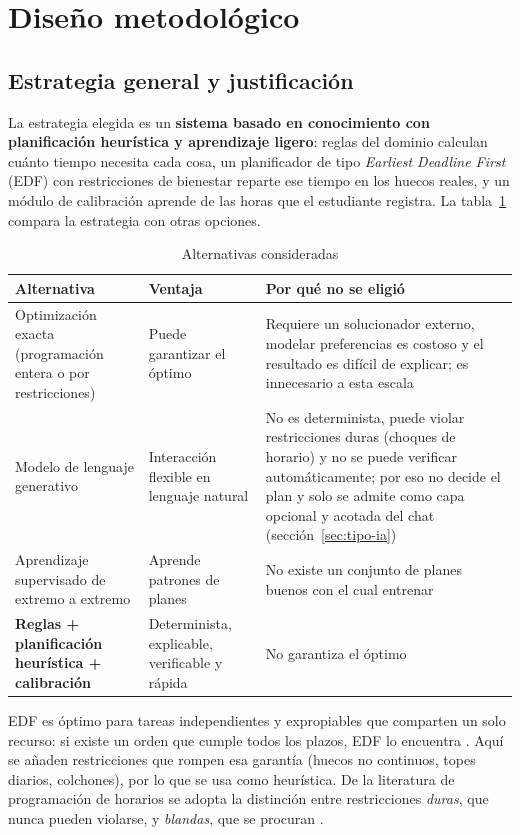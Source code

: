 \section{Diseño metodológico}\label{sec:diseno}

\subsection{Estrategia general y justificación}

La estrategia elegida es un \textbf{sistema basado en conocimiento con planificación heurística y aprendizaje ligero}: reglas del dominio calculan cuánto tiempo necesita cada cosa, un planificador de tipo \emph{Earliest Deadline First} (EDF) con restricciones de bienestar reparte ese tiempo en los huecos reales, y un módulo de calibración aprende de las horas que el estudiante registra. La tabla~\ref{tab:alternativas} compara la estrategia con otras opciones.

\begin{table}[H]
\centering\small
\caption{Alternativas consideradas}\label{tab:alternativas}
\begin{tabularx}{\textwidth}{>{\raggedright\arraybackslash}p{3.6cm} >{\raggedright\arraybackslash}X >{\raggedright\arraybackslash}X}
\toprule
Alternativa & Ventaja & Por qué no se eligió \\
\midrule
Optimización exacta (programación entera o por restricciones) & Puede garantizar el óptimo & Requiere un solucionador externo, modelar preferencias es costoso y el resultado es difícil de explicar; es innecesario a esta escala \\
Modelo de lenguaje generativo & Interacción flexible en lenguaje natural & No es determinista, puede violar restricciones duras (choques de horario) y no se puede verificar automáticamente; por eso no decide el plan y solo se admite como capa opcional y acotada del chat (sección~\ref{sec:tipo-ia}) \\
Aprendizaje supervisado de extremo a extremo & Aprende patrones de planes & No existe un conjunto de planes buenos con el cual entrenar \\
\textbf{Reglas + planificación heurística + calibración} & Determinista, explicable, verificable y rápida & No garantiza el óptimo \\
\bottomrule
\end{tabularx}
\end{table}

EDF es óptimo para tareas independientes y expropiables que comparten un solo recurso: si existe un orden que cumple todos los plazos, EDF lo encuentra \parencite{Liu1973}. Aquí se añaden restricciones que rompen esa garantía (huecos no continuos, topes diarios, colchones), por lo que se usa como heurística. De la literatura de programación de horarios se adopta la distinción entre restricciones \emph{duras}, que nunca pueden violarse, y \emph{blandas}, que se procuran \parencite{Schaerf1999}.

